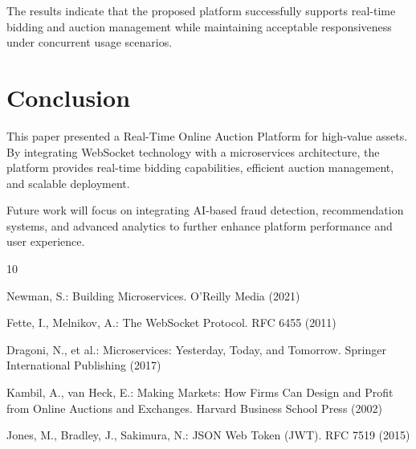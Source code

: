 \documentclass[runningheads]{llncs}
\begin{document}
The results indicate that the proposed platform successfully supports real-time bidding and auction management while maintaining acceptable responsiveness under concurrent usage scenarios.

\section{Conclusion}

This paper presented a Real-Time Online Auction Platform for high-value assets. By integrating WebSocket technology with a microservices architecture, the platform provides real-time bidding capabilities, efficient auction management, and scalable deployment.

Future work will focus on integrating AI-based fraud detection, recommendation systems, and advanced analytics to further enhance platform performance and user experience.

\begin{thebibliography}{10}

Newman, S.:
Building Microservices.
O'Reilly Media (2021)

Fette, I., Melnikov, A.:
The WebSocket Protocol.
RFC 6455 (2011)

Dragoni, N., et al.:
Microservices: Yesterday, Today, and Tomorrow.
Springer International Publishing (2017)

Kambil, A., van Heck, E.:
Making Markets: How Firms Can Design and Profit from Online Auctions and Exchanges.
Harvard Business School Press (2002)

Jones, M., Bradley, J., Sakimura, N.:
JSON Web Token (JWT).
RFC 7519 (2015)

\end{thebibliography}
\end{document}
